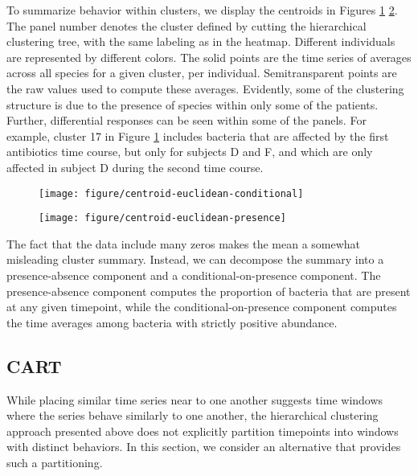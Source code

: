\documentclass[14pt]{extreport}
\begin{document}
To summarize behavior within clusters, we display the centroids in Figures
\ref{fig:centroid-euclidean-conditional} \ref{fig:centroid-euclidean-presence}.
The panel number denotes the cluster defined by cutting the hierarchical
clustering tree, with the same labeling as in the heatmap. Different individuals
are represented by different colors. The solid points are the time series of
averages across all species for a given cluster, per individual. Semitransparent
points are the raw values used to compute these averages. Evidently, some of the
clustering structure is due to the presence of species within only some of the
patients. Further, differential responses can be seen within some of the panels.
For example, cluster 17 in Figure \ref{fig:centroid-euclidean-conditional}
includes bacteria that are affected by the first antibiotics time course, but
only for subjects D and F, and which are only affected in subject D during the
second time course.

\begin{figure}
  \centering
  \texttt{[image: figure/centroid-euclidean-conditional]}
  \caption{\label{fig:centroid-euclidean-conditional} }
\end{figure}

\begin{figure}
  \centering
  \texttt{[image: figure/centroid-euclidean-presence]}
  \caption{\label{fig:centroid-euclidean-presence} }
\end{figure}


The fact that the data include many zeros makes the mean a somewhat misleading
cluster summary. Instead, we can decompose the summary into a presence-absence
component and a conditional-on-presence component. The presence-absence
component computes the proportion of bacteria that are present at any given
timepoint, while the conditional-on-presence component computes the time
averages among bacteria with strictly positive abundance.

\subsection{CART}

While placing similar time series near to one another suggests time windows
where the series behave similarly to one another, the hierarchical clustering
approach presented above does not explicitly partition timepoints into windows
with distinct behaviors. In this section, we consider an alternative that
provides such a partitioning.
\end{document}
